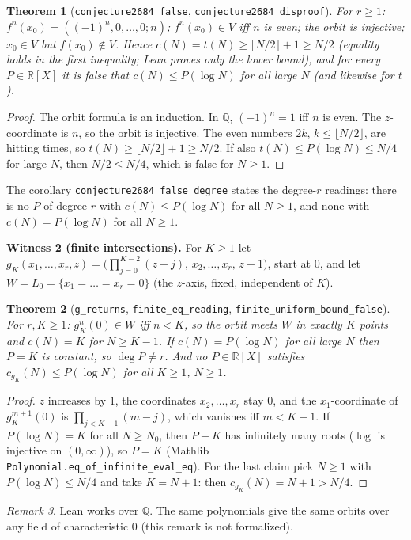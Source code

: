\documentclass[11pt]{article}
\newtheorem{theorem}{Theorem}
\theoremstyle{definition}
\theoremstyle{remark}
\newtheorem{remark}[theorem]{Remark}
\newcommand{\Q}{\mathbb{Q}}
\newcommand{\R}{\mathbb{R}}
\begin{document}
\begin{theorem}[\texttt{conjecture2684\_false}, \texttt{conjecture2684\_disproof}]
For $r\ge1$: $f^n(x_0)=((-1)^n,0,\dots,0;n)$; $f^n(x_0)\in V$ iff $n$ is even; the orbit is
injective; $x_0\in V$ but $f(x_0)\notin V$. Hence $c(N)=t(N)\ge\lfloor N/2\rfloor+1\ge N/2$ (equality holds in the first inequality; Lean
proves only the lower bound), and for
every $P\in\R[X]$ it is false that $c(N)\le P(\log N)$ for all large $N$ (and likewise for $t$).
\end{theorem}
\begin{proof}
The orbit formula is an induction. In $\Q$, $(-1)^n=1$ iff $n$ is even. The $z$-coordinate is $n$,
so the orbit is injective. The even numbers $2k$, $k\le\lfloor N/2\rfloor$, are hitting times, so
$t(N)\ge\lfloor N/2\rfloor+1\ge N/2$. If also $t(N)\le P(\log N)\le N/4$ for large $N$, then
$N/2\le N/4$, which is false for $N\ge1$.
\end{proof}
The corollary \texttt{conjecture2684\_false\_degree} states the degree-$r$ readings: there is no
$P$ of degree $r$ with $c(N)\le P(\log N)$ for all $N\ge1$, and none with $c(N)=P(\log N)$ for all
$N\ge1$.

\textbf{Witness 2 (finite intersections).} For $K\ge1$ let
$g_K(x_1,\dots,x_r,z)=\bigl(\prod_{j=0}^{K-2}(z-j),\,x_2,\dots,x_r,\,z+1\bigr)$, start at $0$, and
let $W=L_0=\{x_1=\dots=x_r=0\}$ (the $z$-axis, fixed, independent of $K$).

\begin{theorem}[\texttt{g\_returns}, \texttt{finite\_eq\_reading}, \texttt{finite\_uniform\_bound\_false}]
For $r,K\ge1$: $g_K^n(0)\in W$ iff $n<K$, so the orbit meets $W$ in exactly $K$ points and
$c(N)=K$ for $N\ge K-1$. If $c(N)=P(\log N)$ for all large $N$ then $P=K$ is constant, so
$\deg P\neq r$. And no $P\in\R[X]$ satisfies $c_{g_K}(N)\le P(\log N)$ for all $K\ge1$, $N\ge1$.
\end{theorem}
\begin{proof}
$z$ increases by $1$, the coordinates $x_2,\dots,x_r$ stay $0$, and the $x_1$-coordinate of
$g_K^{m+1}(0)$ is $\prod_{j<K-1}(m-j)$, which vanishes iff $m<K-1$. If $P(\log N)=K$ for all
$N\ge N_0$, then $P-K$ has infinitely many roots ($\log$ is injective on $(0,\infty)$), so $P=K$
(Mathlib \texttt{Polynomial.eq\_of\_infinite\_eval\_eq}). For the last claim pick $N\ge1$ with
$P(\log N)\le N/4$ and take $K=N+1$: then $c_{g_K}(N)=N+1>N/4$.
\end{proof}

\begin{remark}
Lean works over $\Q$. The same polynomials give the same orbits over any field of characteristic
$0$ (this remark is not formalized).
\end{remark}
\end{document}
